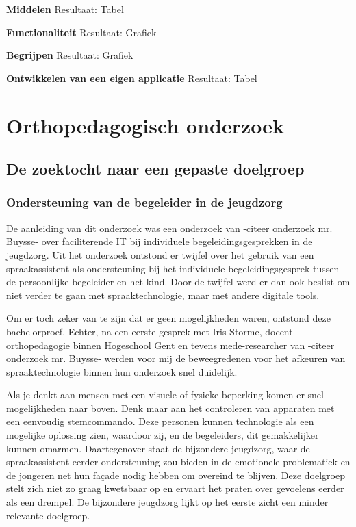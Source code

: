 \textbf{Middelen}
Resultaat: Tabel

\textbf{Functionaliteit}
Resultaat: Grafiek

\textbf{Begrijpen}
Resultaat: Grafiek

\textbf{Ontwikkelen van een eigen applicatie}
Resultaat: Tabel

\section{Orthopedagogisch onderzoek}
\label{Orthopedagogisch onderzoek}
\subsection{De zoektocht naar een gepaste doelgroep}
\label{De zoektocht naar een gepaste doelgroep}

\subsubsection{Ondersteuning van de begeleider in de jeugdzorg}
\label{ondersteuning van de begeleider in de jeugdzorg}
De aanleiding van dit onderzoek was een onderzoek van -citeer onderzoek mr. Buysse- over faciliterende IT bij individuele begeleidingsgesprekken in de jeugdzorg. Uit het onderzoek ontstond er twijfel over het gebruik van een spraakassistent als ondersteuning bij het individuele begeleidingsgesprek tussen de persoonlijke begeleider en het kind. Door de twijfel werd er dan ook beslist om niet verder te gaan met spraaktechnologie, maar met andere digitale tools.

Om er toch zeker van te zijn dat er geen mogelijkheden waren, ontstond deze bachelorproef. Echter, na een eerste gesprek met Iris Storme, docent orthopedagogie binnen Hogeschool Gent en tevens mede-researcher van -citeer onderzoek mr. Buysse- werden voor mij de beweegredenen voor het afkeuren van spraaktechnologie binnen hun onderzoek snel duidelijk. 

Als je denkt aan mensen met een visuele of fysieke beperking komen er snel mogelijkheden naar boven. Denk maar aan het controleren van apparaten met een eenvoudig stemcommando. Deze personen kunnen technologie als een mogelijke oplossing zien, waardoor zij, en de begeleiders, dit gemakkelijker kunnen omarmen.
Daartegenover staat de bijzondere jeugdzorg, waar de spraakassistent eerder ondersteuning zou bieden in de emotionele problematiek en de jongeren net hun façade nodig hebben om overeind te blijven. Deze doelgroep stelt zich niet zo graag kwetsbaar op en ervaart het praten over gevoelens eerder als een drempel. De bijzondere jeugdzorg lijkt op het eerste zicht een minder relevante doelgroep.

